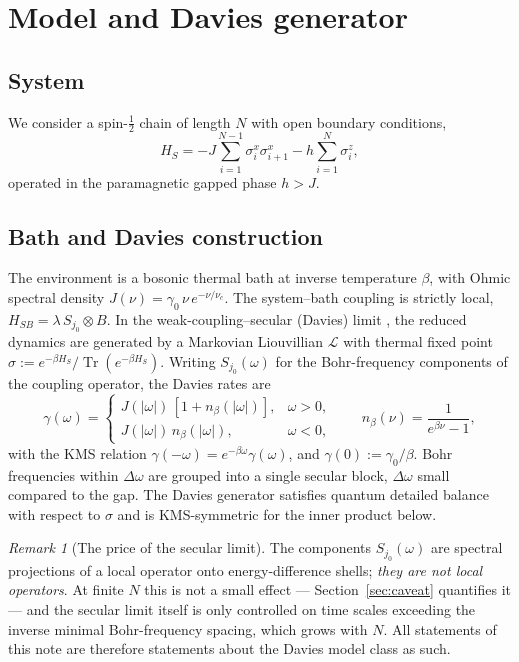 \documentclass[11pt,a4paper]{article}
\theoremstyle{plain}
\theoremstyle{definition}
\theoremstyle{remark}
\newtheorem{remark}[theorem]{Remark}
\newcommand{\Tr}{\operatorname{Tr}}
\begin{document}
\section{Model and Davies generator}

\subsection{System}

We consider a spin-$\tfrac12$ chain of length $N$ with open boundary
conditions,
\begin{equation}
H_S = -J\sum_{i=1}^{N-1}\sigma^x_i\sigma^x_{i+1} - h\sum_{i=1}^N \sigma^z_i,
\end{equation}
operated in the paramagnetic gapped phase $h > J$.

\subsection{Bath and Davies construction}

The environment is a bosonic thermal bath at inverse temperature $\beta$, with
Ohmic spectral density $J(\nu) = \gamma_0\,\nu\, e^{-\nu/\nu_c}$. The
system--bath coupling is strictly local, $H_{SB} = \lambda\, S_{j_0}\otimes B$.
In the weak-coupling--secular (Davies) limit \cite{Davies74,BreuerPetruccione},
the reduced dynamics are generated by a Markovian Liouvillian $\mathcal{L}$
with thermal fixed point $\sigma := e^{-\beta H_S}/\Tr(e^{-\beta H_S})$.
Writing $S_{j_0}(\omega)$ for the Bohr-frequency components of the coupling
operator, the Davies rates are
\begin{equation}
\gamma(\omega) = \begin{cases}
J(|\omega|)\,[1 + n_\beta(|\omega|)], & \omega > 0,\\
J(|\omega|)\, n_\beta(|\omega|), & \omega < 0,
\end{cases}
\qquad n_\beta(\nu) = \frac{1}{e^{\beta\nu}-1},
\end{equation}
with the KMS relation $\gamma(-\omega) = e^{-\beta\omega}\gamma(\omega)$, and
$\gamma(0) := \gamma_0/\beta$. Bohr frequencies within $\Delta\omega$ are
grouped into a single secular block, $\Delta\omega$ small compared to the gap.
The Davies generator satisfies quantum detailed balance with respect to
$\sigma$ and is KMS-symmetric for the inner product below.

\begin{remark}[The price of the secular limit]\label{rem:secularprice}
The components $S_{j_0}(\omega)$ are spectral projections of a local operator
onto energy-difference shells; \emph{they are not local operators}. At finite
$N$ this is not a small effect --- Section~\ref{sec:caveat} quantifies it ---
and the secular limit itself is only controlled on time scales exceeding the
inverse minimal Bohr-frequency spacing, which grows with $N$. All statements
of this note are therefore statements about the Davies model class as such.
\end{remark}
\end{document}
